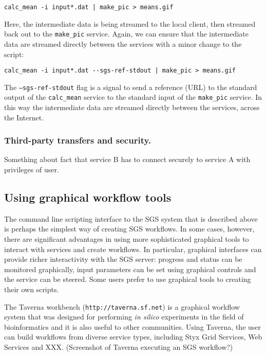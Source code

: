 \documentclass{llncs}
\begin{document}
\begin{verbatim}
calc_mean -i input*.dat | make_pic > means.gif
\end{verbatim}

Here, the intermediate data is being streamed to the local client, then streamed back out to the {\tt make\_pic} service.  Again, we can ensure that the intermediate data are streamed directly between the services with a minor change to the script:

\begin{verbatim}
calc_mean -i input*.dat --sgs-ref-stdout | make_pic > means.gif
\end{verbatim}

The {\tt --sgs-ref-stdout} flag is a signal to send a reference (URL) to the standard output of the {\tt calc\_mean} service to the standard input of the {\tt make\_pic} service.  In this way the intermediate data are streamed directly between the services, across the Internet.

\subsubsection{Third-party transfers and security.}
Something about fact that service B has to connect securely to service A with privileges of user.

\subsection{Using graphical workflow tools}
The command line scripting interface to the SGS system that is described above is perhaps the simplest way of creating SGS workflows.  In some cases, however, there are significant advantages in using more sophisticated graphical tools to interact with services and create workflows.  In particular, graphical interfaces can provide richer interactivity with the SGS server: progress and status can be monitored graphically, input parameters can be set using graphical controls and the service can be steered.  Some users prefer to use graphical tools to creating their own scripts.

The Taverna workbench ({\tt http://taverna.sf.net}) is a graphical workflow system that was designed for performing {\it in silico} experiments in the field of bioinformatics and it is also useful to other communities.  Using Taverna, the user can build workflows from diverse service types, including Styx Grid Services, Web Services and XXX.  (Screenshot of Taverna executing an SGS workflow?)
\end{document}
